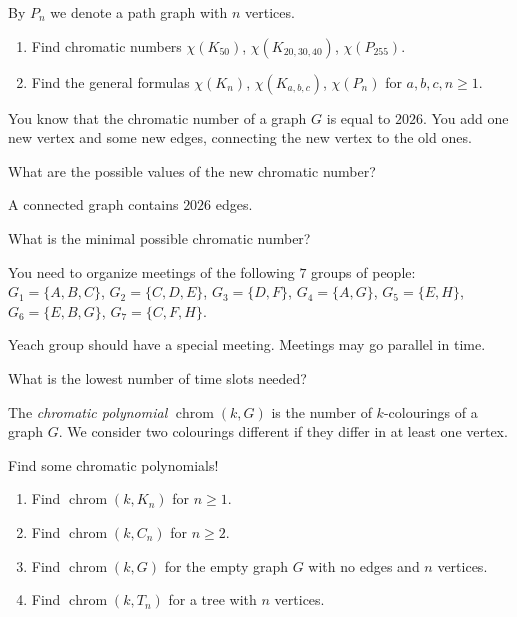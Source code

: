 \documentclass[12pt]{article}
\DeclareMathOperator{\chrom}{chrom}
\begin{document}
\begin{exercise}
    By $P_n$ we denote a path graph with $n$ vertices.

    \begin{enumerate}[label=\alph*)]
        \item Find chromatic numbers $\chi(K_{50})$, $\chi(K_{20, 30, 40})$, $\chi(P_{255})$.
        \item Find the general formulas $\chi(K_n)$, $\chi(K_{a, b, c})$, $\chi(P_n)$ for $a, b, c, n \geq 1$.
    \end{enumerate}
\end{exercise}

\begin{exercise}
    You know that the chromatic number of a graph $G$ is equal to $2026$. 
    You add one new vertex and some new edges, connecting the new vertex to the old ones. 

    What are the possible values of the new chromatic number?
\end{exercise}

\begin{exercise}
    A connected graph contains $2026$ edges. 
    
    What is the minimal possible chromatic number?
\end{exercise}

\begin{exercise}
You need to organize meetings of the following $7$ groups of people:
$G_1 = \{A, B, C\}$, $G_2 = \{C, D, E\}$,
$G_3 = \{D, F\}$, $G_4 = \{A, G\}$, $G_5 = \{E, H\}$,
$G_6 = \{E, B, G\}$, $G_7 = \{C, F, H\}$.

Yeach group should have a special meeting. Meetings may go parallel in time.

What is the lowest number of time slots needed?
\end{exercise}



\begin{definition}
    The \emph{chromatic polynomial} $\chrom(k, G)$ is the number of $k$-colourings of a graph $G$. 
    We consider two colourings different if they differ in at least one vertex.
\end{definition}

\begin{exercise}
    Find some chromatic polynomials!
    \begin{enumerate}[label=\alph*)]
        \item Find $\chrom(k, K_n)$ for $n\geq 1$.
        \item Find $\chrom(k, C_n)$ for $n\geq 2$.
        \item Find $\chrom(k, G)$ for the empty graph $G$ with no edges and $n$ vertices.
        \item Find $\chrom(k, T_n)$ for a tree with $n$ vertices.
    \end{enumerate}
    
\end{exercise}
\end{document}
